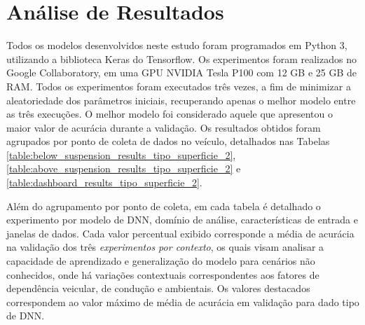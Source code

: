 \section{Análise de Resultados}

Todos os modelos desenvolvidos neste estudo foram programados em Python 3, utilizando a biblioteca Keras do Tensorflow. Os experimentos foram realizados no Google Collaboratory, em uma GPU NVIDIA Tesla P100 com 12 GB e 25 GB de RAM. Todos os experimentos foram executados três vezes, a fim de minimizar a aleatoriedade dos parâmetros iniciais, recuperando apenas o melhor modelo entre as três execuções. O melhor modelo foi considerado aquele que apresentou o maior valor de acurácia durante a validação. Os resultados obtidos foram agrupados por ponto de coleta de dados no veículo, detalhados nas Tabelas \ref{table:below_suspension_results_tipo_superficie_2}, \ref{table:above_suspension_results_tipo_superficie_2} e \ref{table:dashboard_results_tipo_superficie_2}.

Além do agrupamento por ponto de coleta, em cada tabela é detalhado o experimento por modelo de DNN, domínio de análise, características de entrada e janelas de dados. Cada valor percentual exibido corresponde a média de acurácia na validação dos três \emph{experimentos por contexto}, os quais visam analisar a capacidade de aprendizado e generalização do modelo para cenários não conhecidos, onde há variações contextuais correspondentes aos fatores de dependência veicular, de condução e ambientais. Os valores destacados correspondem ao valor máximo de média de acurácia em validação para dado tipo de DNN.

